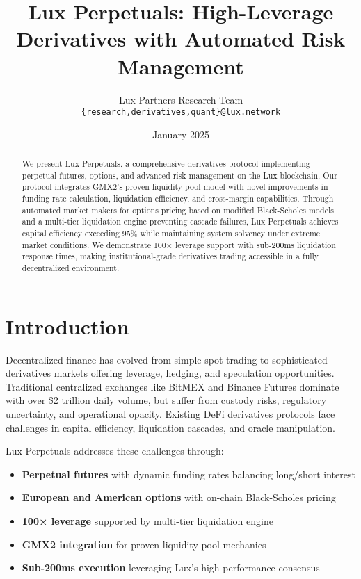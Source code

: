 \documentclass[11pt,a4paper]{article}
\title{\textbf{Lux Perpetuals: High-Leverage Derivatives with Automated Risk Management}}
\author{
    Lux Partners Research Team\\
    \texttt{\{research,derivatives,quant\}@lux.network}
}
\date{January 2025}
\begin{document}
\maketitle

\begin{abstract}
We present Lux Perpetuals, a comprehensive derivatives protocol implementing perpetual futures, options, and advanced risk management on the Lux blockchain. Our protocol integrates GMX2's proven liquidity pool model with novel improvements in funding rate calculation, liquidation efficiency, and cross-margin capabilities. Through automated market makers for options pricing based on modified Black-Scholes models and a multi-tier liquidation engine preventing cascade failures, Lux Perpetuals achieves capital efficiency exceeding 95\% while maintaining system solvency under extreme market conditions. We demonstrate 100× leverage support with sub-200ms liquidation response times, making institutional-grade derivatives trading accessible in a fully decentralized environment.
\end{abstract}

\section{Introduction}

Decentralized finance has evolved from simple spot trading to sophisticated derivatives markets offering leverage, hedging, and speculation opportunities. Traditional centralized exchanges like BitMEX and Binance Futures dominate with over \$2 trillion daily volume, but suffer from custody risks, regulatory uncertainty, and operational opacity. Existing DeFi derivatives protocols face challenges in capital efficiency, liquidation cascades, and oracle manipulation.

Lux Perpetuals addresses these challenges through:
\begin{itemize}
    \item \textbf{Perpetual futures} with dynamic funding rates balancing long/short interest
    \item \textbf{European and American options} with on-chain Black-Scholes pricing
    \item \textbf{100× leverage} supported by multi-tier liquidation engine
    \item \textbf{GMX2 integration} for proven liquidity pool mechanics
    \item \textbf{Sub-200ms execution} leveraging Lux's high-performance consensus
\end{itemize}
\end{document}
